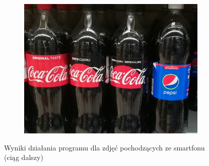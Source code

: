 \documentclass[11pt,a4paper,twoside]{report}
\begin{document}
\begin{figure}
\begin{subfigure}[b]{0.48\textwidth}
	        \includegraphics[width=\textwidth]{img/camera/8}
	    \end{subfigure}
	    \caption{Wyniki działania programu dla zdjęć pochodzących ze smartfonu (ciąg dalszy)}
	    \label{fig:smartfon-2}
	\end{figure}
\end{document}
